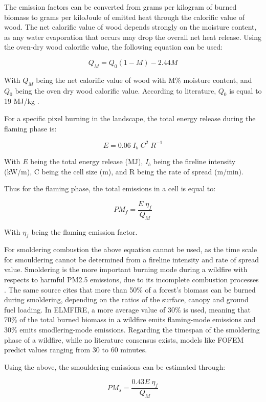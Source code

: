 The emission factors can be converted from grams per kilogram of burned biomass to grams per kiloJoule of emitted heat through the calorific value of wood. The net calorific value of wood depends strongly on the moisture content, as any water evaporation that occurs may drop the overall net heat release. Using the oven-dry wood calorific value, the following equation can be used:

\[
Q_{M}=Q_0(1-M)-2.44M
\]

With $Q_M$ being the net calorific value of wood with M\% moisture content, and $Q_0$ being the oven dry wood calorific value. According to literature, $Q_0$ is equal to 19 MJ/kg \cite{drysdaleIntroductionFireDynamics2011}.

For a specific pixel burning in the landscape, the total energy release during the flaming phase is:

\[
E=0.06\;I_b\;C^2\;R^{-1}
\]

With $E$ being the total energy release (MJ), $I_b$ being the fireline intensity (kW/m), C being the cell size (m), and R being the rate of spread (m/min). 

Thus for the flaming phase, the total emissions in a cell is equal to:

\[
PM_f = \frac{E\;\eta_f}{Q_M}
\]

With $\eta_f$ being the flaming emission factor. 

For smoldering combustion the above equation cannot be used, as the time scale for smouldering cannot be determined from a fireline intensity and rate of spread value. Smoldering is the more important burning mode during a wildfire with respects to harmful PM2.5 emissions, due to its incomplete combustion processes \cite{reinSmoulderingCombustionPhenomena2009}. The same source cites that more than 50\% of a forest's biomass can be burned during smoldering, depending on the ratios of the surface, canopy and ground fuel loading. In ELMFIRE, a more average value of 30\% is used, meaning that 70\% of the total burned biomass in a wildfire emits flaming-mode emissions and 30\% emits smodlering-mode emissions. Regarding the timespan of the smoldering phase of a wildfire, while no literature consensus exists, models like FOFEM predict values ranging from 30 to 60 minutes. 

Using the above, the smouldering emissions can be estimated through:

\[
PM_s = \frac{0.43E\;\eta_f}{Q_M}
\]


